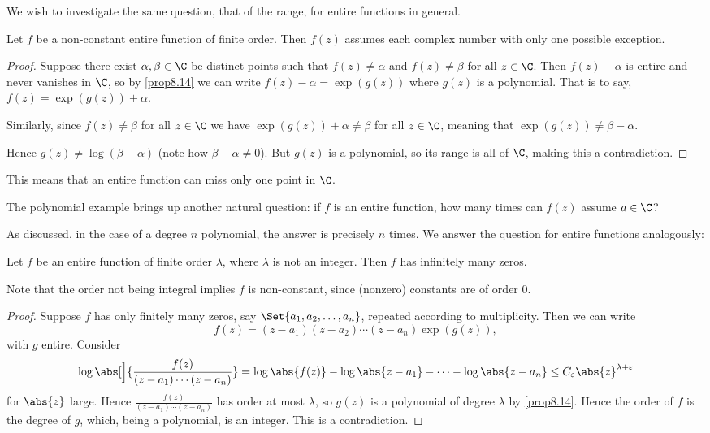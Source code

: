We wish to investigate the same question, that of the range, for entire functions in general.

\begin{theorem}\label{thm8.16}
	Let $f$ be a non-constant entire function of finite order.
	Then $f(z)$ assumes each complex number with only one possible exception.
\end{theorem}

\begin{proof}
	Suppose there exist $\alpha, \beta \in \C$ be distinct points such that $f(z) \neq \alpha$ and $f(z) \neq \beta$ for all $z \in \C$.
	Then $f(z) - \alpha$ is entire and never vanishes in $\C$, so by \autoref{prop8.14} we can write $f(z) - \alpha = \exp(g(z))$ where $g(z)$ is a polynomial.
	That is to say, $f(z) = \exp(g(z)) + \alpha$.

	Similarly, since $f(z) \neq \beta$ for all $z \in \C$ we have $\exp(g(z)) + \alpha \neq \beta$ for all $z \in \C$, meaning that $\exp(g(z)) \neq \beta - \alpha$.

	Hence $g(z) \neq \log(\beta - \alpha)$ (note how $\beta - \alpha \neq 0$).
	But $g(z)$ is a polynomial, so its range is all of $\C$, making this a contradiction.
\end{proof}

This means that an entire function can miss only one point in $\C$.

The polynomial example brings up another natural question: if $f$ is an entire function, how many times can $f(z)$ assume $a \in \C$?

As discussed, in the case of a degree $n$ polynomial, the answer is precisely $n$ times.
We answer the question for entire functions analogously:

\begin{theorem}\label{thm8.17}
	Let $f$ be an entire function of finite order $\lambda$, where $\lambda$ is not an integer.
	Then $f$ has infinitely many zeros.
\end{theorem}

Note that the order not being integral implies $f$ is non-constant, since (nonzero) constants are of order $0$.

\begin{proof}
	Suppose $f$ has only finitely many zeros, say $\Set{a_1, a_2, \dots, a_n}$, repeated according to multiplicity.
	Then we can write
	\[
		f(z) = (z - a_1) (z - a_2) \dotsm (z - a_n) \exp(g(z)),
	\]
	with $g$ entire.
	Consider
	\[
		\log \abs[\Big]{\frac{f(z)}{(z - a_1) \dotsm (z - a_n)}} = \log \abs{f(z)} - \log\abs{z - a_1} - \dots - \log\abs{z - a_n} \leq C_\varepsilon \abs{z}^{\lambda + \varepsilon}
	\]
	for $\abs{z}$ large.
	Hence $\frac{f(z)}{(z - a_1) \dotsm (z - a_n)}$ has order at most $\lambda$, so $g(z)$ is a polynomial of degree $\lambda$ by \autoref{prop8.14}.
	Hence the order of $f$ is the degree of $g$, which, being a polynomial, is an integer.
	This is a contradiction.
\end{proof}

